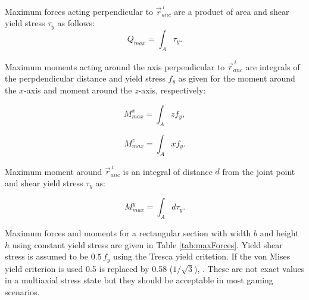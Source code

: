 Maximum forces acting perpendicular to $\vec{r}_{anc}^{\,i} $
are a product of area and shear yield stress $\tau_y$ as follows:
\begin{equation} \label{eq:fQ}
Q_{max}= \int_A \tau_y.
\end{equation}

Maximum moments acting around the axis perpendicular to $\vec{r}_{anc}^{\,i} $
are integrals of the perpdendicular distance 
and yield stress $f_y$ as given for the moment around the $x$-axis 
and moment around the $z$-axis, respectively:

\begin{equation} \label{eq:Mx}
M_{max}^x= \int_A z f_y,
\end{equation}

\begin{equation} \label{eq:Mz}
M_{max}^z= \int_A x f_y.
\end{equation}

Maximum moment around $\vec{r}_{anc}^{\,i} $
is an integral of distance $d$ from the joint point
and shear yield stress $\tau_y$ as: 

\begin{equation} \label{eq:My}
M_{max}^y= \int_A d \tau_y.
\end{equation}

Maximum forces and moments for a
rectangular section with width $b$ and height $h$ using constant yield stress
are given in Table \ref{tab:maxForces}.
Yield shear stress is assumed to be $ 0.5\, f_y$ using the Tresca yield critetion.
If the von Mises yield criterion is used 0.5 is replaced by 0.58 ($1/\sqrt{3}$), \cite{dowling}.
These are not exact values in a multiaxial stress state but they
should be acceptable in most gaming scenarios.

\begin {table}
\label{tab:maxForces} 
\end {table}

